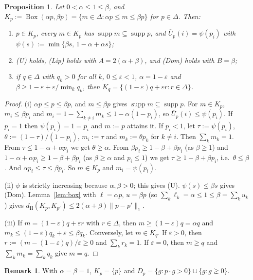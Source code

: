 \documentclass[11pt]{article}
\newtheorem{proposition}[theorem]{Proposition}
\theoremstyle{definition}
\newtheorem{remark}[theorem]{Remark}
\newcommand{\supp}{\operatorname{supp}}
\newcommand{\dH}{d_{\mathrm H}}
\newcommand{\Ub}{\overline U}
\newcommand{\Bx}{\operatorname{Box}}
\begin{document}
\begin{proposition}\label{prop:band}
Let $0<\alpha\le1\le\beta$, and $K_p:=\Bx(\alpha p,\beta p)=\{m\in\Delta:\alpha p\le m\le\beta p\}$ for $p\in\Delta$. Then:
\begin{enumerate}[label=(\roman*)]
\item $p\in K_p$, every $m\in K_p$ has $\supp m\subseteq\supp p$, and $\Ub_p(i)=\psi(p_i)$ with $\psi(s):=\min\{\beta s,\,1-\alpha+\alpha s\}$;
\item (U) holds, (Lip) holds with $A=2(\alpha+\beta)$, and (Dom) holds with $B=\beta$;
\item if $q\in\Delta$ with $q_k>0$ for all $k$, $0\le\varepsilon<1$, $\alpha=1-\varepsilon$ and $\beta\ge1-\varepsilon+\varepsilon/\min_kq_k$, then $K_q=\{(1-\varepsilon)q+\varepsilon r:r\in\Delta\}$.
\end{enumerate}
\end{proposition}

\begin{proof}
(i) $\alpha p\le p\le\beta p$, and $m\le\beta p$ gives $\supp m\subseteq\supp p$. For $m\in K_p$, $m_i\le\beta p_i$ and $m_i=1-\sum_{k\ne i}m_k\le1-\alpha(1-p_i)$, so $\Ub_p(i)\le\psi(p_i)$. If $p_i=1$ then $\psi(p_i)=1=p_i$ and $m:=p$ attains it. If $p_i<1$, let $\tau:=\psi(p_i)$, $\theta:=(1-\tau)/(1-p_i)$, $m_i:=\tau$ and $m_k:=\theta p_k$ for $k\neq i$. Then $\sum_km_k=1$. From $\tau\le1-\alpha+\alpha p_i$ we get $\theta\ge\alpha$. From $\beta p_i\ge1-\beta+\beta p_i$ (as $\beta\ge1$) and $1-\alpha+\alpha p_i\ge1-\beta+\beta p_i$ (as $\beta\ge\alpha$ and $p_i\le1$) we get $\tau\ge1-\beta+\beta p_i$, i.e.\ $\theta\le\beta$. And $\alpha p_i\le\tau\le\beta p_i$. So $m\in K_p$ and $m_i=\psi(p_i)$.

(ii) $\psi$ is strictly increasing because $\alpha,\beta>0$; this gives (U). $\psi(s)\le\beta s$ gives (Dom). Lemma~\ref{lem:box} with $\ell=\alpha p$, $u=\beta p$ (so $\sum_k\ell_k=\alpha\le1\le\beta=\sum_ku_k$) gives $\dH(K_p,K_{p'})\le2(\alpha+\beta)\|p-p'\|_1$.

(iii) If $m=(1-\varepsilon)q+\varepsilon r$ with $r\in\Delta$, then $m\ge(1-\varepsilon)q=\alpha q$ and $m_k\le(1-\varepsilon)q_k+\varepsilon\le\beta q_k$. Conversely, let $m\in K_q$. If $\varepsilon>0$, then $r:=(m-(1-\varepsilon)q)/\varepsilon\ge0$ and $\sum_kr_k=1$. If $\varepsilon=0$, then $m\ge q$ and $\sum_km_k=\sum_kq_k$ give $m=q$.
\end{proof}

\begin{remark}\label{rem:precise}
With $\alpha=\beta=1$, $K_p=\{p\}$ and $D_p=\{g:p\cdot g>0\}\cup\{g:g\gneq0\}$.
\end{remark}
\end{document}

